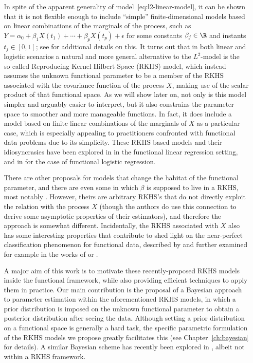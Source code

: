 In spite of the apparent generality of model~\eqref{eq:l2-linear-model}, it can be shown that it is not flexible enough to include ``simple'' finite-dimensional models based on linear combinations of the marginals of the process, such as \(Y=\alpha_0 + \beta_1 X(t_1)+ \cdots + \beta_p X(t_p) + \epsilon\) for some constants \(\beta_j\in\R\) and instants \(t_j\in[0,1]\); see \citet{berrendero2020general} for additional details on this. It turns out that in both linear and logistic scenarios a natural and more general alternative to the \(L^2\)-model is the so-called Reproducing Kernel Hilbert Space (RKHS) model, which instead assumes the unknown functional parameter to be a member of the RKHS associated with the covariance function of the process \(X\), making use of the scalar product of that functional space. As we will show later on, not only is this model simpler and arguably easier to interpret, but it also constrains the parameter space to smoother and more manageable functions. In fact, it does include a model based on finite linear combinations of the marginals of \(X\) as a particular case, which is especially appealing to practitioners confronted with functional data problems due to its simplicity. These RKHS-based models and their idiosyncrasies have been explored in \citet{berrendero2019rkhs, berrendero2020general} in the functional linear regression setting, and in \citet{berrendero2018functional} for the case of functional logistic regression.

There are other proposals for models that change the habitat of the functional parameter, and there are even some in which \(\beta\) is supposed to live in a RKHS, most notably \citet{yuan2010reproducing}. However, theirs are arbitrary RKHS's that do not directly exploit the relation with the process \(X\) (though the authors do use this connection to derive some asymptotic properties of their estimators), and therefore the approach is somewhat different. Incidentally, the RKHS associated with \(X\) also has some interesting properties that contribute to shed light on the near-perfect classification phenomenon for functional data, described by \citet{delaigle2012achieving} and further examined for example in the works of \citet{berrendero2018use} or \citet{torrecilla2020optimal}.

A major aim of this work is to motivate these recently-proposed RKHS models inside the functional framework, while also providing efficient techniques to apply them in practice. Our main contribution is the proposal of a Bayesian approach to parameter estimation within the aforementioned RKHS models, in which a prior distribution is imposed on the unknown functional parameter to obtain a posterior distribution after seeing the data. Although setting a prior distribution on a functional space is generally a hard task, the specific parametric formulation of the RKHS models we propose greatly facilitates this (see Chapter~\ref{ch:bayesian} for details). A similar Bayesian scheme has recently been explored in \citet{grollemund2019bayesian}, albeit not within a RKHS framework.

